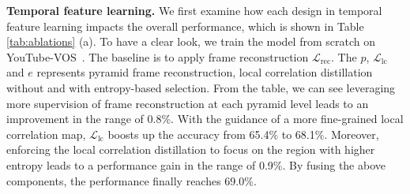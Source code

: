 \documentclass{article}
\begin{document}
 
 \textbf{Temporal feature learning.} We first examine how each design in temporal feature learning impacts the overall performance, which is shown in Table \ref{tab:ablations} (a). To have a clear look, we train the model from scratch on YouTube-VOS~\cite{xu2018youtube}. The baseline is to apply frame reconstruction $\mathcal{L}_{\mathrm{rec}}$. The $p$, $\mathcal{L}_{\mathrm{lc}}$ and $e$ represents pyramid frame reconstruction, local correlation distillation without and with entropy-based selection. From the table, we can see leveraging more supervision of frame reconstruction at each pyramid level leads to an improvement in the range of 0.8\%. With the guidance of a more fine-grained local correlation map, $\mathcal{L}_{\mathrm{lc}}$ boosts up the accuracy from 65.4\% to 68.1\%. Moreover, enforcing the local correlation distillation to focus on the region with higher entropy leads to a performance gain in the range of 0.9\%. By fusing the above components, the performance finally reaches 69.0\%.
 
\end{document}
